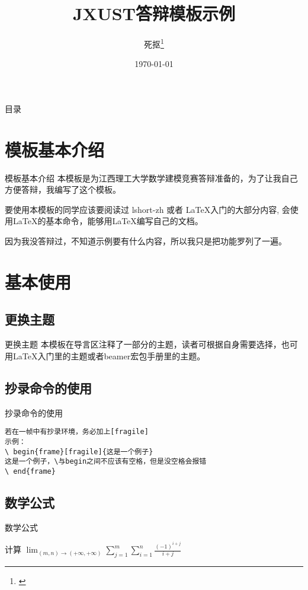 \documentclass{jxustbeamer}
\title{JXUST答辩模板示例}
\author{死抠\thanks{\href{https://github.com/sikouhjw/LaTeX-learning-notes}{\fbox{github链接}}}}
\institute{\LaTeX{}学院}
\date{\scriptsize {\today}}
\begin{document}
	\begin{frame}
		\titlepage
	\end{frame}

    \begin{frame}{目录}
    	 \tableofcontents[hideallsubsections]
    \end{frame}

\section{模板基本介绍}
    \begin{frame}{模板基本介绍}
        本模板是为江西理工大学数学建模竞赛答辩准备的，为了让我自己方便答辩，我编写了这个模板。
        
        要使用本模板的同学应该要阅读过 lshort-zh\cite{lshort-zh} 或者 \LaTeX{}入门\cite{刘海洋}的大部分内容, 会使用\LaTeX{}的基本命令，能够用\LaTeX{}编写自己的文档。
        
        因为我没答辩过，不知道示例要有什么内容，所以我只是把功能罗列了一遍。
    \end{frame}
\section{基本使用}
\subsection{更换主题}
\begin{frame}{更换主题}
	本模板在导言区注释了一部分的主题，读者可根据自身需要选择，也可用\LaTeX{}入门\cite{刘海洋}里的主题或者beamer宏包手册里的主题。
\end{frame}
\subsection{抄录命令的使用}
    \begin{frame}[fragile]{抄录命令的使用}
\begin{verbatim}
若在一帧中有抄录环境，务必加上[fragile]
示例：
\ begin{frame}[fragile]{这是一个例子}
这是一个例子，\与begin之间不应该有空格，但是没空格会报错
\ end{frame}
\end{verbatim}
    \end{frame}
\subsection{数学公式}
\begin{frame}[fragile]{数学公式}

计算 $\displaystyle\lim_{(m,n)\to(+\infty,+\infty)}\sum_{j=1}^{m}\sum_{i=1}^{n}\frac{(-1)^{i+j}}{i+j}$

\end{frame}
\end{document}
